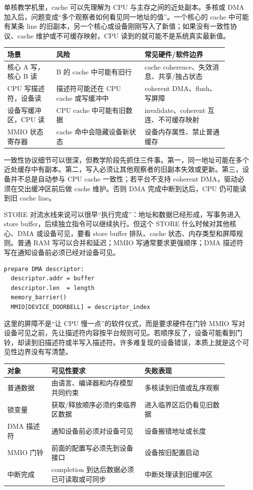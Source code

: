 单核教学机里，cache 可以先理解为 CPU 与主存之间的近处副本。多核或 DMA 加入后，问题变成“多个观察者如何看见同一地址的值”。一个核心的 cache 中可能有某条 line 的旧副本，另一个核心或设备刚刚写入了新值；如果没有一致性协议、cache 维护或不可缓存映射，CPU 读到的就可能不是系统真实最新值。

\begin{longtable}{L{0.2\linewidth}L{0.36\linewidth}L{0.34\linewidth}}
\toprule
场景 & 风险 & 常见硬件/软件边界 \\
\midrule
核心 A 写，核心 B 读 & B 的 cache 中可能有旧行 & cache coherence、失效消息、共享/独占状态 \\
CPU 写描述符，设备读 & 描述符可能还在 CPU cache 或写缓冲中 & coherent DMA、flush、写屏障 \\
设备写缓冲区，CPU 读 & CPU cache 中可能有旧数据 & invalidate、coherent 互连、不可缓存映射 \\
MMIO 状态寄存器 & cache 命中会隐藏设备新状态 & 设备内存属性、禁止普通缓存 \\
\bottomrule
\end{longtable}

一致性协议细节可以很深，但教学阶段先抓住三件事。第一，同一地址可能在多个近处缓存中有副本。第二，写入必须让其他观察者的旧副本失效或更新。第三，设备并不总是自动参与 CPU cache 一致性；若平台不支持 coherent DMA，驱动必须在交出缓冲区前后做 cache 维护。否则 DMA 完成中断到达后，CPU 仍可能读到旧 cache line。

STORE 对流水线来说可以很早“执行完成”：地址和数据已经形成，写事务进入 store buffer，后续独立指令可以继续执行。但这个 STORE 什么时候对其他核心、DMA 或设备可见，要看 store buffer 排队、cache 状态、内存类型和屏障规则。普通 RAM 写可以合并和延迟；MMIO 写通常要求更强顺序；DMA 描述符写在通知设备前必须已经对设备可见。

\begin{lstlisting}
prepare DMA descriptor:
  descriptor.addr = buffer
  descriptor.len  = length
  memory_barrier()
  MMIO[DEVICE_DOORBELL] = descriptor_index
\end{lstlisting}

这里的屏障不是“让 CPU 慢一点”的软件仪式，而是要求硬件在门铃 MMIO 写对设备可见之前，先让描述符内容按平台规则可见。若顺序反了，设备可能看到门铃，却读到旧描述符或半写入描述符。许多难复现的设备错误，本质上就是这个可见性边界没有写清楚。

\begin{longtable}{L{0.18\linewidth}L{0.38\linewidth}L{0.34\linewidth}}
\toprule
对象 & 可见性要求 & 失败表现 \\
\midrule
普通数据 & 由语言、编译器和内存模型共同约束 & 多核读到旧值或乱序观察 \\
锁变量 & 获取/释放顺序必须约束临界区数据 & 进入临界区后仍看见旧数据 \\
DMA 描述符 & 通知设备前必须对设备可见 & 设备搬错地址或长度 \\
MMIO 门铃 & 前面的配置写必须先到设备接口 & 设备按旧配置启动 \\
中断完成 & completion 到达后数据必须已可读取或可同步 & 中断处理读到旧缓冲区 \\
\bottomrule
\end{longtable}

